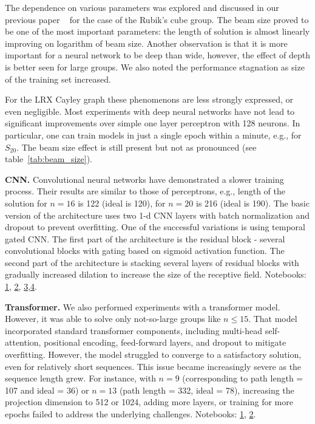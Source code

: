 \documentclass[reqno,11pt]{amsart}
\begin{document}
The dependence on various parameters was explored and discussed in our previous paper ~\cite{chervov2025machinelearningapproachbeats} for the case of the Rubik's cube group. The beam size proved to be one of the most important parameters: the length of solution is almost linearly improving on logarithm of beam size. Another observation is that it is more important for a neural network to be deep than wide, however, the effect of depth is better seen for large groups. We also noted the performance stagnation as size of the training set increased.  

For the LRX Cayley graph these phenomenons are less strongly expressed, or even negligible. 
Most experiments with deep neural networks have not lead to significant improvements over simple one layer perceptron with 128 neurons. In particular, one can train models in just a single epoch within a minute, e.g., for $S_{20}$. The beam size effect is still present but not as pronounced (see table~\ref{tab:beam_size}).


{\bf CNN.}
Convolutional neural networks have demonstrated a slower training process. Their results are similar to those of perceptrons, e.g., length of the solution for $n=16$ is 122 (ideal is 120), for $n=20$ is 216 (ideal is 190). The basic version of the architecture uses two 1-d CNN layers with batch normalization and dropout to prevent overfitting. One of the successful variations is using temporal gated CNN. The first part of the architecture is the residual block - several convolutional blocks with gating based on sigmoid activation function. The second part of the architecture is stacking several layers of residual blocks with gradually increased dilation to increase the size of the receptive field.
Notebooks: \href{https://www.kaggle.com/code/artgor/encoding-as-permutation-matrix-1d-cnn}{1}, \href{https://www.kaggle.com/code/artgor/encoding-as-permutation-mat-simple-2d-cnn}{2}, \href{https://colab.research.google.com/drive/1oWuQg33bveHYqVET4IES_EWIH1nsa4yi}{3},\href{https://colab.research.google.com/drive/1oWuQg33bveHYqVET4IES_EWIH1nsa4yi}{4}.

{\bf Transformer.} We also performed experiments with a transformer model. However, it was able to solve only not-so-large groups like $n\le 15$. 
That model incorporated standard transformer components, including multi-head self-attention, positional encoding, feed-forward layers, and dropout to mitigate overfitting. However, the model struggled to converge to a satisfactory solution, even for relatively short sequences. This issue became increasingly severe as the sequence length grew. For instance, with $n=9$ (corresponding to path length = 107 and ideal = 36) or $n=13$ (path length = 332, ideal = 78), increasing the projection dimension to 512 or 1024, adding more layers, or training for more epochs failed to address the underlying challenges. Notebooks: \href{https://www.kaggle.com/code/nursmen/lrx-transformer-training}{1}, \href{https://www.kaggle.com/code/nursmen/lrx-transformer-use}{2}.
\end{document}
